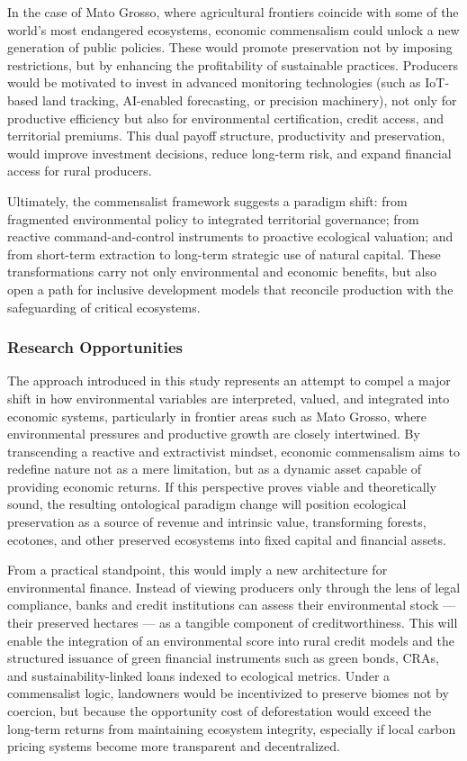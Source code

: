 In the case of Mato Grosso, where agricultural frontiers coincide with some of the world's most endangered ecosystems, economic commensalism could unlock a new generation of public policies. These would promote preservation not by imposing restrictions, but by enhancing the profitability of sustainable practices. Producers would be motivated to invest in advanced monitoring technologies (such as IoT-based land tracking, AI-enabled forecasting, or precision machinery), not only for productive efficiency but also for environmental certification, credit access, and territorial premiums. This dual payoff structure, productivity and preservation, would improve investment decisions, reduce long-term risk, and expand financial access for rural producers.

Ultimately, the commensalist framework suggests a paradigm shift: from fragmented environmental policy to integrated territorial governance; from reactive command-and-control instruments to proactive ecological valuation; and from short-term extraction to long-term strategic use of natural capital. These transformations carry not only environmental and economic benefits, but also open a path for inclusive development models that reconcile production with the safeguarding of critical ecosystems.

\subsubsection{Research Opportunities}

The approach introduced in this study represents an attempt to compel a major shift in how environmental variables are interpreted, valued, and integrated into economic systems, particularly in frontier areas such as Mato Grosso, where environmental pressures and productive growth are closely intertwined. By transcending a reactive and extractivist mindset, economic commensalism aims to redefine nature not as a mere limitation, but as a dynamic asset capable of providing economic returns. If this perspective proves viable and theoretically sound, the resulting ontological paradigm change will position ecological preservation as a source of revenue and intrinsic value, transforming forests, ecotones, and other preserved ecosystems into fixed capital and financial assets.

From a practical standpoint, this would imply a new architecture for environmental finance. Instead of viewing producers only through the lens of legal compliance, banks and credit institutions can assess their environmental stock — their preserved hectares — as a tangible component of creditworthiness. This will enable the integration of an environmental score into rural credit models and the structured issuance of green financial instruments such as green bonds, CRAs, and sustainability-linked loans indexed to ecological metrics. Under a commensalist logic, landowners would be incentivized to preserve biomes not by coercion, but because the opportunity cost of deforestation would exceed the long-term returns from maintaining ecosystem integrity, especially if local carbon pricing systems become more transparent and decentralized.

